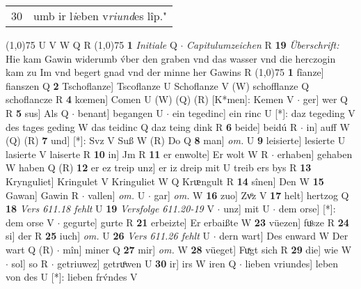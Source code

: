 \documentclass[8pt,a4paper,notitlepage]{article}
\begin{document}
\begin{table}[ht]
\begin{minipage}[t]{0.5\linewidth}
\begin{tabular}{rl}
30 & umb ir l\textit{i}eben v\textit{riund}es lîp."\\ 
\end{tabular}
\scriptsize
\line(1,0){75} \newline
U V W Q R \newline
\line(1,0){75} \newline
\textbf{1} \textit{Initiale} Q   $\cdot$ \textit{Capitulumzeichen} R  \textbf{19} \textit{Überschrift:} Hie kam Gawin widerumb v́ber den graben vnd das wasser vnd die herczogin kam zu Im vnd begert gnad vnd der minne her Gawins R  \newline
\line(1,0){75} \newline
\textbf{1} fîanze] fianszen Q \textbf{2} Tschoflanze] Tscoflanze U Schoflanze V (W) schofflanze Q schoflancze R \textbf{4} kœmen] Comen U (W) (Q) (R) [K*men]: Kemen  V  $\cdot$ ger] wer Q R \textbf{5} sus] Als Q  $\cdot$ benant] begangen U  $\cdot$ ein tegedinc] ein rinc U [*]: daz tegeding V des tages geding W das teidinc Q daz teing dink R \textbf{6} beide] beidú R  $\cdot$ in] auff W (Q) (R) \textbf{7} und] [*]: Svz V Suß W (R) Do Q \textbf{8} man] \textit{om.} U \textbf{9} leisierte] lesierte U lasierte V laiserte R \textbf{10} in] Jm R \textbf{11} er enwolte] Er wolt W R  $\cdot$ erhaben] gehaben W haben Q (R) \textbf{12} er ez treip unz] er iz dreip mit U treib ers bys R \textbf{13} Krynguliet] Kringulet V Kringuliet W Q Krᵫngult R \textbf{14} sînen] Den W \textbf{15} Gawan] Gawin R  $\cdot$ vallen] \textit{om.} U  $\cdot$ gar] \textit{om.} W \textbf{16} zuo] Zvͦz V \textbf{17} helt] hertzog Q \textbf{18} \textit{Vers 611.18 fehlt} U  \textbf{19} \textit{Versfolge 611.20-19} V   $\cdot$ unz] mit U  $\cdot$ dem orse] [*]: dem orse V  $\cdot$ gegurte] gurte R \textbf{21} erbeizte] Er erbaißte W \textbf{23} vüezen] fuͦsze R \textbf{24} si] der R \textbf{25} iuch] \textit{om.} U \textbf{26} \textit{Vers 611.26 fehlt} U   $\cdot$ dern wart] Des enward W Der wart Q (R)  $\cdot$ mîn] miner Q \textbf{27} mir] \textit{om.} W \textbf{28} vüeget] Fuͯgt sich R \textbf{29} die] wie W  $\cdot$ sol] so R  $\cdot$ getriuwez] getruͦwen U \textbf{30} ir] irs W iren Q  $\cdot$ lieben vriundes] leben von des U [*]: lieben frv́ndes V \newline
\end{minipage}
\end{table}
\end{document}
